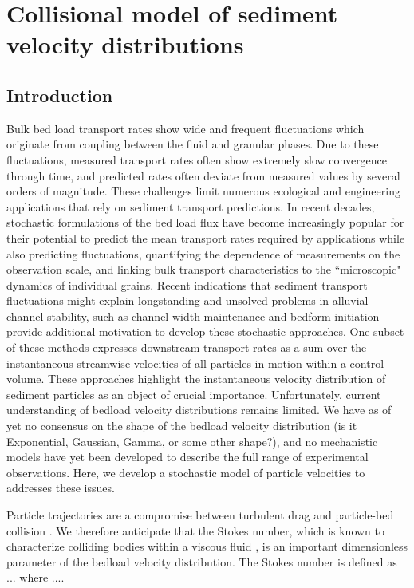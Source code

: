 
\chapter{Collisional model of sediment velocity distributions}
\label{ch:langevin}
\section{Introduction}

Bulk bed load transport rates show wide and frequent fluctuations which originate from coupling between the fluid and granular phases.
Due to these fluctuations, measured transport rates often show extremely slow convergence through time, and predicted rates often deviate from measured values by several orders of magnitude.
These challenges limit numerous ecological and engineering applications that rely on sediment transport predictions.
In recent decades, stochastic formulations of the bed load flux have become increasingly popular for their potential to predict the mean transport rates required by applications while also predicting fluctuations, quantifying the dependence of measurements on the observation scale, and linking bulk transport characteristics to the ``microscopic" dynamics of individual grains.
Recent indications that sediment transport fluctuations might explain longstanding and unsolved problems in alluvial channel stability, such as channel width maintenance \citep{Boltzman, Lajeunesse2020} and bedform initiation \citep{Ancey2014,Bohorquez2016} provide additional motivation to develop these stochastic approaches.
One subset of these methods expresses downstream transport rates as a sum over the instantaneous streamwise velocities of all particles in motion within a control volume.
These approaches highlight the instantaneous velocity distribution of sediment particles as an object of crucial importance.
Unfortunately, current understanding of bedload velocity distributions remains limited.
We have as of yet no consensus on the shape of the bedload velocity distribution (is it Exponential, Gaussian, Gamma, or some other shape?), and no mechanistic models have yet been developed to describe the full range of experimental observations.
Here, we develop a stochastic model of particle velocities to addresses these issues.

Particle trajectories are a compromise between turbulent drag and particle-bed collision \citep{Wiberg1985}. We therefore anticipate that the Stokes number, which is known to characterize colliding bodies within a viscous fluid \citep{}, is an important dimensionless parameter of the bedload velocity distribution.
The Stokes number is defined as ... where ....

